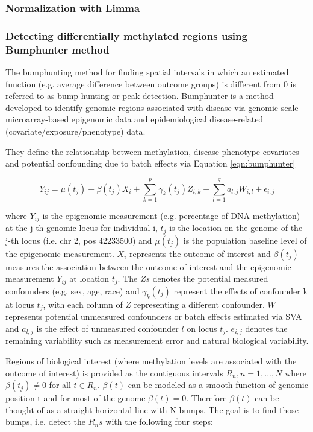 \subsubsection{Normalization with Limma}

\subsubsection{Detecting differentially methylated regions using Bumphunter method}
The bumphunting method for finding spatial intervals in which an estimated function (e.g. average difference between outcome groups) is different from 0 is referred to as bump hunting or peak detection. Bumphunter is a method developed to identify genomic regions associated with disease via genomic-scale microarray-based epigenomic data and epidemiological disease-related (covariate/exposure/phenotype) data.

They define the relationship between methylation, disease phenotype covariates and potential confounding due to batch effects via Equation \ref{eqn:bumphunter}

\begin{equation}
    \label{eqn:bumphunter}
    Y_{ij} = \mu(t_j) + \beta(t_j)X_i + \sum_{k=1}^p \gamma_k (t_j)Z_{i,k} + \sum_{l = 1}^q a_{l,j}W_{i,l} + \epsilon_{i,j}
\end{equation}

where $Y_{ij}$ is the epigenomic measurement (e.g. percentage of DNA methylation) at the j-th genomic locus for individual i, $t_j$ is the location on the genome of the j-th locus (i.e. chr 2, pos 42233500) and $\mu(t_j)$ is the population baseline level of the epigenomic measurement. $X_i$ represents the outcome of interest and $\beta(t_j)$ measures the association between the outcome of interest and the epigenomic measurement $Y_{ij}$ at location $t_j$. The $Zs$ denotes the potential measured confounders (e.g. sex, age, race) and $\gamma_k (t_j)$ represent the effects of confounder k at locus $t_j$, with each column of $Z$ representing a different confounder. $W$ represents potential unmeasured confounders or batch effects estimated via SVA and $a_{l,j}$ is the effect of unmeasured confounder $l$ on locus $t_j$. $e_{i,j}$ denotes the remaining variability such as measurement error and natural biological variability. 

Regions of biological interest (where methylation levels are associated with the outcome of interest) is provided as the contiguous intervals $R_n, n = 1,...,N$ where $\beta(t_j) \neq 0$ for all $t\in R_n$. $\beta(t)$ can be modeled as a smooth function of genomic position t and for most of the genome $\beta(t)=0$. Therefore $\beta(t)$ can be thought of as a straight horizontal line with N bumps. The goal is to find those bumps, i.e. detect the $R_ns$ with the following four steps: 


